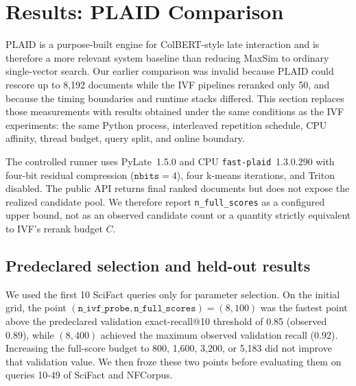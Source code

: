 \section{Results: PLAID Comparison}
\label{sec:results-plaid}

PLAID is a purpose-built engine for ColBERT-style late interaction and is
therefore a more relevant system baseline than reducing MaxSim to ordinary
single-vector search. Our earlier comparison was invalid because PLAID 
could rescore up to 8,192 documents while the IVF pipelines reranked only 50, 
and because the timing boundaries and runtime stacks differed. This section 
replaces those measurements with results obtained under the same conditions 
as the IVF experiments: the same Python process, interleaved repetition schedule, 
CPU affinity, thread budget, query split, and online boundary.

The controlled runner uses PyLate~1.5.0 and CPU
\texttt{fast-plaid}~1.3.0.290 with four-bit residual compression
($\texttt{nbits}=4$), four k-means iterations, and Triton disabled. The public
API returns final ranked documents but does not expose the realized candidate
pool. We therefore report \texttt{n\_full\_scores} as a configured upper bound, 
not as an observed candidate count or a quantity strictly equivalent to 
IVF's rerank budget $C$.

\subsection{Predeclared selection and held-out results}

We used the first 10 SciFact queries only for parameter selection. On the initial 
grid, the point $(\texttt{n\_ivf\_probe},\texttt{n\_full\_scores})=(8,100)$ was 
the fastest point above the predeclared validation exact-recall@10 threshold of 
0.85 (observed 0.89), while $(8,400)$ achieved the maximum observed validation 
recall (0.92). Increasing the full-score budget to 800, 1,600, 3,200, or 5,183 
did not improve that validation value. We then froze these two points before 
evaluating them on queries 10-49 of SciFact and NFCorpus.

